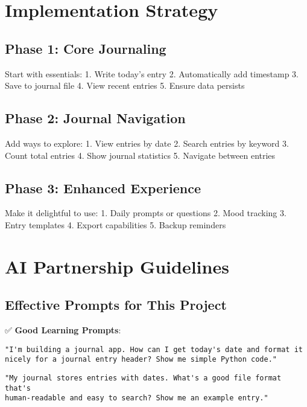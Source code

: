 \documentclass[
  letterpaper,
  DIV=11,
  numbers=noendperiod,
  oneside]{scrreprt}
\begin{document}
\section{Implementation Strategy}\label{implementation-strategy-6}

\subsection{Phase 1: Core Journaling}\label{phase-1-core-journaling}

Start with essentials: 1. Write today's entry 2. Automatically add
timestamp 3. Save to journal file 4. View recent entries 5. Ensure data
persists

\subsection{Phase 2: Journal
Navigation}\label{phase-2-journal-navigation}

Add ways to explore: 1. View entries by date 2. Search entries by
keyword 3. Count total entries 4. Show journal statistics 5. Navigate
between entries

\subsection{Phase 3: Enhanced
Experience}\label{phase-3-enhanced-experience-2}

Make it delightful to use: 1. Daily prompts or questions 2. Mood
tracking 3. Entry templates 4. Export capabilities 5. Backup reminders

\section{AI Partnership Guidelines}\label{ai-partnership-guidelines-6}

\subsection{Effective Prompts for This
Project}\label{effective-prompts-for-this-project-6}

✅ \textbf{Good Learning Prompts}:

\begin{verbatim}
"I'm building a journal app. How can I get today's date and format it 
nicely for a journal entry header? Show me simple Python code."
\end{verbatim}

\begin{verbatim}
"My journal stores entries with dates. What's a good file format that's 
human-readable and easy to search? Show me an example entry."
\end{verbatim}
\end{document}
